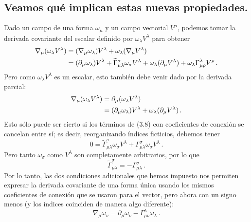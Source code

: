 \documentclass[11pt,b5paper,openany,twoside]{book}
\newcommand{\p}[1]{{\partial_{#1}}}
\begin{document}
\subsection{Veamos qué implican estas nuevas propiedades.}
Dado un campo de una forma $\omega_\mu$ y un campo vectorial $V^\mu$, podemos tomar la derivada covariante del escalar definido por $\omega_\lambda V^\lambda$ para obtener
\begin{align}
\nabla_\mu(\omega_\lambda V^\lambda) &=
(\nabla_\mu \omega_\lambda)V^\lambda + \omega_\lambda
(\nabla_\mu V^\lambda) \notag \\
&=  (\p\mu\omega_\lambda)V^\lambda +
\widetilde{\Gamma}^\sigma_{\mu\lambda}\omega_\sigma V^\lambda
+\omega_\lambda(\p\mu V^\lambda) +
\omega_\lambda\Gamma^\lambda_{\mu\rho}V^\rho\,. \label{3.8}
\end{align}
Pero como $\omega_\lambda V^\lambda$ es un escalar, esto también debe venir dado por la derivada parcial:
\begin{align}
\nabla_\mu(\omega_\lambda V^\lambda) &=  \partial_\mu
(\omega_\lambda V^\lambda)  \notag \\  &=
(\partial_\mu \omega_\lambda)V^\lambda + \omega_\lambda
(\partial_\mu V^\lambda)\,. \label{3.9}
\end{align}
Esto sólo puede ser cierto si los términos de (3.8) con coeficientes de conexión se cancelan entre sí; es decir, reorganizando índices ficticios, debemos tener
\begin{equation}
0 = \widetilde{\Gamma}^\sigma_{\mu\lambda}\omega_\sigma V^\lambda
+ {\Gamma}^\sigma_{\mu\lambda}\omega_\sigma V^\lambda\,.\label{3.10}
\end{equation}
Pero tanto $\omega_\sigma$ como $V^\lambda$ son completamente arbitrarios, por lo que
\begin{equation}
\widetilde{\Gamma}^\sigma_{\mu\lambda} = - \Gamma^\sigma_{\mu\lambda}
\,.\label{3.11}
\end{equation}
Por lo tanto, las dos condiciones adicionales que hemos impuesto nos permiten expresar la derivada covariante de una forma única usando los mismos coeficientes de conexión que se usaron para el vector, pero ahora con un signo menos (y los índices coinciden de manera algo diferente):
\begin{equation}
\nabla_\mu\omega_\nu = \partial_\mu\omega_\nu
-\Gamma^\lambda_{\mu\nu}\omega_\lambda\,.\label{3.12}
\end{equation}
\end{document}
